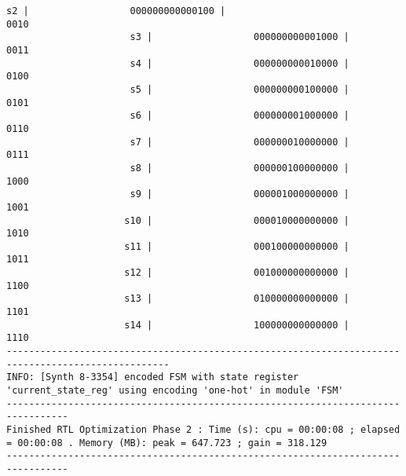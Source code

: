\documentclass [a4paper, 12pt]{article}
\begin{document}
\begin{lstlisting}[breaklines, basicstyle=\tiny]
                      s2 |                  000000000000100 |                             0010
                      s3 |                  000000000001000 |                             0011
                      s4 |                  000000000010000 |                             0100
                      s5 |                  000000000100000 |                             0101
                      s6 |                  000000001000000 |                             0110
                      s7 |                  000000010000000 |                             0111
                      s8 |                  000000100000000 |                             1000
                      s9 |                  000001000000000 |                             1001
                     s10 |                  000010000000000 |                             1010
                     s11 |                  000100000000000 |                             1011
                     s12 |                  001000000000000 |                             1100
                     s13 |                  010000000000000 |                             1101
                     s14 |                  100000000000000 |                             1110
---------------------------------------------------------------------------------------------------
INFO: [Synth 8-3354] encoded FSM with state register 'current_state_reg' using encoding 'one-hot' in module 'FSM'
---------------------------------------------------------------------------------
Finished RTL Optimization Phase 2 : Time (s): cpu = 00:00:08 ; elapsed = 00:00:08 . Memory (MB): peak = 647.723 ; gain = 318.129
---------------------------------------------------------------------------------


\end{lstlisting}
\end{document}

